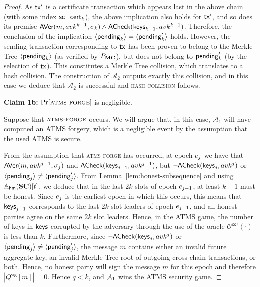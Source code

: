 \begin{proof}
  As $\mathsf{tx}'$ is a certificate transaction which appears last in the above chain
  (with some index $\mathsf{sc\_cert}_k$), the above implication also holds for $\mathsf{tx}'$,
  and so does its premise
  $
    \textsf{AVer}(m,\allowbreak avk^{k-1},\allowbreak \sigma_k)\allowbreak
    \allowbreak\land\allowbreak
    \textsf{ACheck}(\textsf{keys}_{k-1},\allowbreak avk^{k-1})
  $.
  Therefore, the conclusion of the implication
  $\langle\mathsf{pending}_k\rangle = \langle\mathsf{pending}'_k\rangle$ holds.
  However, the sending transaction corresponding to $\mathsf{tx}$ has been proven to belong to the Merkle Tree
  $\langle\mathsf{pending}_k\rangle$ (as verified by $P_{\mathbf{MC}}$), but does not belong
  to $\mathsf{pending}'_k$ (by the selection of $\mathsf{tx}$). This constitutes a Merkle Tree collision,
  which translates to a hash collision. The construction of $\mathcal{A}_2$
  outputs exactly this collision, and in this case we deduce that
  $\mathcal{A}_2$ is successful and \textsc{hash-collision} follows.

  \textbf{Claim 1b:} $\Pr[\textsc{atms-forge}]$  is negligible.

  \noindent
  Suppose that $\textsc{atms-forge}$ occurs. We will argue that, in this case,
  $\mathcal{A}_1$ will have computed an ATMS forgery, which is a negligible
  event by the assumption that the used ATMS is secure.

  From the assumption that
  \textsc{atms-forge} has occurred, at epoch $e_j$ we have that
  $\textsf{AVer}(m,\allowbreak avk^{j-1},\allowbreak \sigma_j)$ and $\textsf{ACheck}(\textsf{keys}_{j-1},
  avk^{j-1})$, but $\lnot \textsf{ACheck}(\textsf{keys}_j, avk^j)$ or
  $\langle\mathsf{pending}_j\rangle\allowbreak\neq\allowbreak\langle\mathsf{pending}'_j\rangle$. From
  Lemma~\ref{lem:honest-subsequence} and using $\mathbb{A}_{\mathsf{hm}}(\mathbf{SC})[t]$, we deduce that in the last $2k$ slots of epoch
  $e_{j-1}$, at least $k+1$ must be honest. Since $e_j$ is the
  earliest epoch in which this occurs, this means that $\textsf{keys}_{j-1}$
  corresponds to the last $2k$ slot leaders of epoch $e_{j-1}$, and all
  honest parties agree on the same $2k$ slot leaders. Hence, in the ATMS game,
  the number of keys in $\textsf{keys}$ corrupted by the adversary through the use
  of the oracle $\mathcal{O}^\textsf{cor}(\cdot)$ is less than $k$. Furthermore,
  since $\lnot \textsf{ACheck}(\textsf{keys}_j, avk^j)$ or $\langle\mathsf{pending}_j\rangle \neq \langle\mathsf{pending}'_j\rangle$,
  the message $m$ contains either an invalid future aggregate key,
  an invalid Merkle Tree root of outgoing cross-chain transactions, or both.
  Hence, no honest party will sign the message $m$ for this epoch and therefore $|Q^\textsf{sig}[m]| = 0$. Hence
  $q < k$, %
  and $\mathcal{A}_1$ wins the ATMS security game.


\end{proof}
